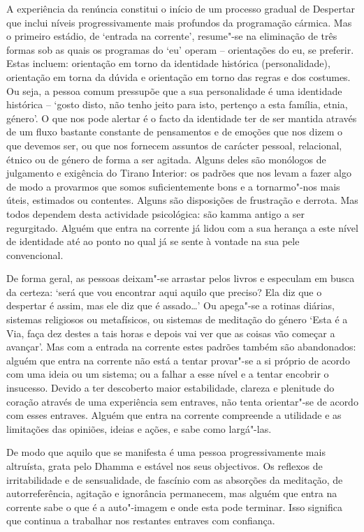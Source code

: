 A experiência da renúncia constitui o início de um processo gradual de Despertar
que inclui níveis progressivamente mais profundos da programação cármica. Mas o
primeiro estádio, de `entrada na corrente', resume"-se na eliminação de três
formas sob as quais os programas do `eu' operam -- orientações do eu, se
preferir. Estas incluem: orientação em torno da identidade histórica
(personalidade), orientação em torna da dúvida e orientação em torno das regras
e dos costumes. Ou seja, a pessoa comum pressupõe que a sua personalidade é uma
identidade histórica -- `gosto disto, não tenho jeito para isto, pertenço a esta
família, etnia, género'. O que nos pode alertar é o facto da identidade ter de
ser mantida através de um fluxo bastante constante de pensamentos e de emoções
que nos dizem o que devemos ser, ou que nos fornecem assuntos de carácter
pessoal, relacional, étnico ou de género de forma a ser agitada. Alguns deles
são monólogos de julgamento e exigência do Tirano Interior: os padrões que nos
levam a fazer algo de modo a provarmos que somos suficientemente bons e a
tornarmo"-nos mais úteis, estimados ou contentes. Alguns são disposições de
frustração e derrota. Mas todos dependem desta actividade psicológica: são kamma
antigo a ser regurgitado. Alguém que entra na corrente já lidou com a sua
herança a este nível de identidade até ao ponto no qual já se sente à vontade na
sua pele convencional.

De forma geral, as pessoas deixam"-se arrastar pelos livros e especulam em busca
da certeza: `será que vou encontrar aqui aquilo que preciso? Ela diz que o
despertar é assim, mas ele diz que é assado\ldots{}' Ou apega"-se a rotinas
diárias, sistemas religiosos ou metafísicos, ou sistemas de meditação do género
`Esta é a Via, faça dez destes a tais horas e depois vai ver que as coisas vão
começar a avançar'. Mas com a entrada na corrente estes padrões também são
abandonados: alguém que entra na corrente não está a tentar provar"-se a si
próprio de acordo com uma ideia ou um sistema; ou a falhar a esse nível e a
tentar encobrir o insucesso. Devido a ter descoberto maior estabilidade, clareza
e plenitude do coração através de uma experiência sem entraves, não tenta
orientar"-se de acordo com esses entraves. Alguém que entra na corrente
compreende a utilidade e as limitações das opiniões, ideias e ações, e sabe como
largá"-las.

De modo que aquilo que se manifesta é uma pessoa progressivamente mais
altruísta, grata pelo Dhamma e estável nos seus objectivos. Os reflexos de
irritabilidade e de sensualidade, de fascínio com as absorções da meditação, de
autorreferência, agitação e ignorância permanecem, mas alguém que entra na
corrente sabe o que é a auto"-imagem e onde esta pode terminar. Isso significa
que continua a trabalhar nos restantes entraves com confiança.


